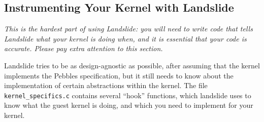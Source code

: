 \documentclass{article}
\begin{document}
\subsection{Instrumenting Your Kernel with Landslide}
\label{sec:hooks}
{\large \em This is the hardest part of using Landslide: you will need to write code that tells Landslide what your kernel is doing when, and it is essential that your code is accurate.
Please pay extra attention to this section.}

Landslide tries to be as design-agnostic as possible, after assuming that the kernel implements the Pebbles specification, but it still needs to know about the implementation of certain abstractions within the kernel. The file \texttt{kernel\_specifics.c} contains several ``hook'' functions, which landslide uses to know what the guest kernel is doing, and which you need to implement for your kernel.
\end{document}
